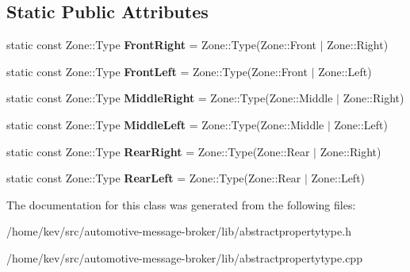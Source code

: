 \subsection*{Static Public Attributes}
\begin{DoxyCompactItemize}
\item 
\hypertarget{classZone_a37315b6f9837e00447422775a96a20ca}{static const Zone\-::\-Type {\bfseries Front\-Right} = Zone\-::\-Type(Zone\-::\-Front $\vert$ Zone\-::\-Right)}\label{classZone_a37315b6f9837e00447422775a96a20ca}

\item 
\hypertarget{classZone_a6a87ff703e79adeb7c1d625565b19465}{static const Zone\-::\-Type {\bfseries Front\-Left} = Zone\-::\-Type(Zone\-::\-Front $\vert$ Zone\-::\-Left)}\label{classZone_a6a87ff703e79adeb7c1d625565b19465}

\item 
\hypertarget{classZone_a1d569d1d452b7c9201572882076afff0}{static const Zone\-::\-Type {\bfseries Middle\-Right} = Zone\-::\-Type(Zone\-::\-Middle $\vert$ Zone\-::\-Right)}\label{classZone_a1d569d1d452b7c9201572882076afff0}

\item 
\hypertarget{classZone_a750a3ead97ed9634c09e2cd581052be2}{static const Zone\-::\-Type {\bfseries Middle\-Left} = Zone\-::\-Type(Zone\-::\-Middle $\vert$ Zone\-::\-Left)}\label{classZone_a750a3ead97ed9634c09e2cd581052be2}

\item 
\hypertarget{classZone_a0e756f33e1f50c13ee13fe46027a1359}{static const Zone\-::\-Type {\bfseries Rear\-Right} = Zone\-::\-Type(Zone\-::\-Rear $\vert$ Zone\-::\-Right)}\label{classZone_a0e756f33e1f50c13ee13fe46027a1359}

\item 
\hypertarget{classZone_a7c83e580e0478be716f344eb56a041e3}{static const Zone\-::\-Type {\bfseries Rear\-Left} = Zone\-::\-Type(Zone\-::\-Rear $\vert$ Zone\-::\-Left)}\label{classZone_a7c83e580e0478be716f344eb56a041e3}

\end{DoxyCompactItemize}


The documentation for this class was generated from the following files\-:\begin{DoxyCompactItemize}
\item 
/home/kev/src/automotive-\/message-\/broker/lib/abstractpropertytype.\-h\item 
/home/kev/src/automotive-\/message-\/broker/lib/abstractpropertytype.\-cpp\end{DoxyCompactItemize}
